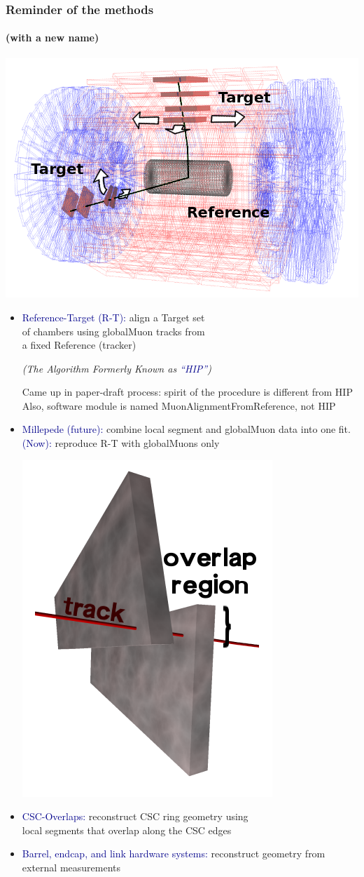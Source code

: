\documentclass[compress]{beamer}
\begin{document}
\begin{frame}
\frametitle{Reminder of the methods}
\framesubtitle{(with a new name)}

\hfill \includegraphics[width=3.5 cm]{reference-target.png}

\vspace{-2.3 cm}
\begin{itemize}\setlength{\itemsep}{0.5 cm}
\item \textcolor{darkblue}{Reference-Target (R-T):} align a Target set \\ of chambers using globalMuon tracks
  from \\ a fixed Reference (tracker)

{\it (The Algorithm Formerly Known as \textcolor{darkblue}{``HIP''})}

{\scriptsize Came up in paper-draft process: spirit of the procedure is different from HIP \\ Also, software module is named MuonAlignmentFromReference, not HIP}

\item \textcolor{darkblue}{Millepede (future):} combine local segment
  and globalMuon data into one fit.  \textcolor{darkblue}{(Now):} reproduce R-T with globalMuons only

\vspace{-0.1 cm}
\hfill \includegraphics[width=1.5 cm]{overlaps.png}

\vspace{-2.1 cm}
\item \textcolor{darkblue}{CSC-Overlaps:} reconstruct CSC ring
  geometry using \\ local segments that overlap along the CSC edges

\item \textcolor{darkblue}{Barrel, endcap, and link hardware systems:}
  reconstruct geometry from external measurements
\end{itemize}
\end{frame}
\end{document}
